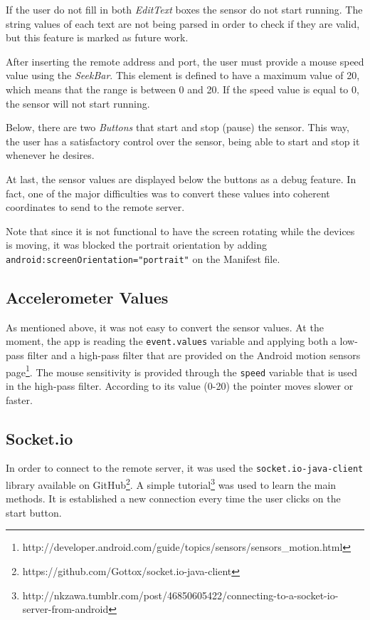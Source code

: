 \documentclass{llncs}
\begin{document}
If the user do not fill in both \textit{EditText} boxes the sensor do not start running. The string values of each text are not being parsed in order to check if they are valid, but this feature is marked as future work.

After inserting the remote address and port, the user must provide a mouse speed value using the \textit{SeekBar}. This element is defined to have a maximum value of 20, which means that the range is between 0 and 20. If the speed value is equal to 0, the sensor will not start running.

Below, there are two \textit{Buttons} that start and stop (pause) the sensor. This way, the user has a satisfactory control over the sensor, being able to start and stop it whenever he desires.

At last, the sensor values are displayed below the buttons as a debug feature. In fact, one of the major difficulties was to convert these values into coherent coordinates to send to the remote server.

Note that since it is not functional to have the screen rotating while the devices is moving, it was blocked the portrait orientation by adding \texttt{android:screenOrientation="portrait"} on the Manifest file.

\subsection{Accelerometer Values}

As mentioned above, it was not easy to convert the sensor values. At the moment, the app is reading the \texttt{event.values} variable and applying both a low-pass filter and a high-pass filter that are provided on the Android motion sensors page\footnote{http://developer.android.com/guide/topics/sensors/sensors\_motion.html}. The mouse sensitivity is provided through the \texttt{speed} variable that is used in the high-pass filter. According to its value (0-20) the pointer moves slower or faster.

\subsection{Socket.io}

In order to connect to the remote server, it was used the \texttt{socket.io-java-client} library available on GitHub\footnote{https://github.com/Gottox/socket.io-java-client}. A simple tutorial\footnote{http://nkzawa.tumblr.com/post/46850605422/connecting-to-a-socket-io-server-from-android} was used to learn the main methods. It is established a new connection every time the user clicks on the start button.
\end{document}

